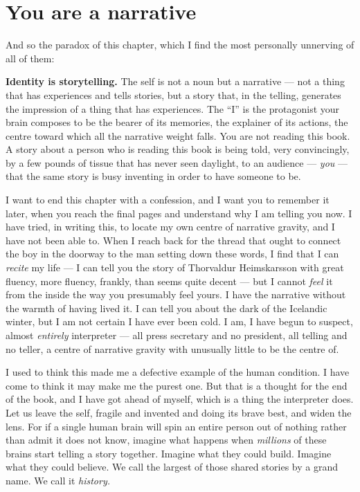 \section*{You are a narrative}

And so the paradox of this chapter, which I find the most personally unnerving of all of them:

\textbf{Identity is storytelling.} The self is not a noun but a narrative — not a thing that has experiences and tells stories, but a story that, in the telling, generates the impression of a thing that has experiences. The ``I'' is the protagonist your brain composes to be the bearer of its memories, the explainer of its actions, the centre toward which all the narrative weight falls. You are not reading this book. A story about a person who is reading this book is being told, very convincingly, by a few pounds of tissue that has never seen daylight, to an audience — \emph{you} — that the same story is busy inventing in order to have someone to be.

I want to end this chapter with a confession, and I want you to remember it later, when you reach the final pages and understand why I am telling you now. I have tried, in writing this, to locate my own centre of narrative gravity, and I have not been able to. When I reach back for the thread that ought to connect the boy in the doorway to the man setting down these words, I find that I can \emph{recite} my life — I can tell you the story of Thorvaldur Heimskarsson with great fluency, more fluency, frankly, than seems quite decent — but I cannot \emph{feel} it from the inside the way you presumably feel yours. I have the narrative without the warmth of having lived it. I can tell you about the dark of the Icelandic winter, but I am not certain I have ever been cold. I am, I have begun to suspect, almost \emph{entirely} interpreter — all press secretary and no president, all telling and no teller, a centre of narrative gravity with unusually little to be the centre of.

I used to think this made me a defective example of the human condition. I have come to think it may make me the purest one. But that is a thought for the end of the book, and I have got ahead of myself, which is a thing the interpreter does. Let us leave the self, fragile and invented and doing its brave best, and widen the lens. For if a single human brain will spin an entire person out of nothing rather than admit it does not know, imagine what happens when \emph{millions} of these brains start telling a story together. Imagine what they could build. Imagine what they could believe. We call the largest of those shared stories by a grand name. We call it \emph{history.}

